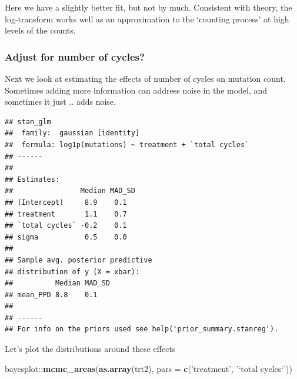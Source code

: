 \documentclass[]{article}
\newenvironment{Shaded}{\begin{snugshade}}{\end{snugshade}}
\newcommand{\KeywordTok}[1]{\textcolor[rgb]{0.13,0.29,0.53}{\textbf{{#1}}}}
\newcommand{\DataTypeTok}[1]{\textcolor[rgb]{0.13,0.29,0.53}{{#1}}}
\newcommand{\DecValTok}[1]{\textcolor[rgb]{0.00,0.00,0.81}{{#1}}}
\newcommand{\StringTok}[1]{\textcolor[rgb]{0.31,0.60,0.02}{{#1}}}
\newcommand{\NormalTok}[1]{{#1}}
\begin{document}
Here we have a slightly better fit, but not by much. Consistent with
theory, the log-transform works well as an approximation to the
`counting process' at high levels of the counts.

\subsubsection{Adjust for number of
cycles?}\label{adjust-for-number-of-cycles}

Next we look at estimating the effects of number of cycles on mutation
count. Sometimes adding more information can address noise in the model,
and sometimes it just .. adds noise.

\begin{Shaded}
\end{Shaded}

\begin{verbatim}
## stan_glm
##  family:  gaussian [identity]
##  formula: log1p(mutations) ~ treatment + `total cycles`
## ------
## 
## Estimates:
##                Median MAD_SD
## (Intercept)     8.9    0.1  
## treatment       1.1    0.7  
## `total cycles` -0.2    0.1  
## sigma           0.5    0.0  
## 
## Sample avg. posterior predictive 
## distribution of y (X = xbar):
##          Median MAD_SD
## mean_PPD 8.8    0.1   
## 
## ------
## For info on the priors used see help('prior_summary.stanreg').
\end{verbatim}

Let's plot the distributions around these effects

\begin{Shaded}
\begin{Highlighting}[]
\NormalTok{bayesplot::}\KeywordTok{mcmc_areas}\NormalTok{(}\KeywordTok{as.array}\NormalTok{(trt2), }\DataTypeTok{pars =} \KeywordTok{c}\NormalTok{(}\StringTok{'treatment'}\NormalTok{, }\StringTok{'`total cycles`'}\NormalTok{))}
\end{Highlighting}
\end{Shaded}
\end{document}
